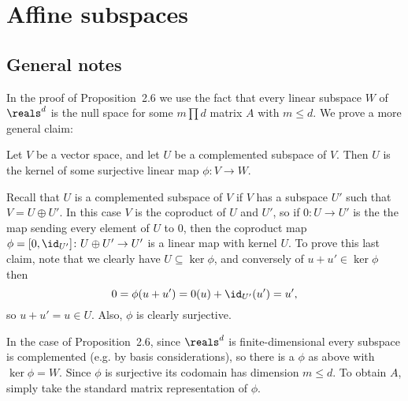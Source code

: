 \documentclass[article, a4paper, 11pt, oneside]{memoir}
\title{\doctitle}
\author{\docauthor}
\numberwithin{equation}{chapter}
\newenvironment{displaytheorem}{%
	\begin{displayquote}\itshape%
}{%
	\end{displayquote}%
}
\theoremstyle{nonumberplain}
\begin{document}
\maketitle

\addtocounter{chapter}{1}

\chapter{Affine subspaces}

\section*{General notes}

\begin{remarkbreak}
    \label{rem:linear-subspaces-are-null-spaces}
    In the proof of Proposition~2.6 we use the fact that every linear subspace $W$ of $\reals^d$ is the null space for some $m \prod d$ matrix $A$ with $m \leq d$. We prove a more general claim:
    \begin{displaytheorem}
        Let $V$ be a vector space, and let $U$ be a complemented subspace of $V$. Then $U$ is the kernel of some surjective linear map $\phi \colon V \to W$.
    \end{displaytheorem}
    Recall that $U$ is a complemented subspace of $V$ if $V$ has a subspace $U'$ such that $V = U \oplus U'$. In this case $V$ is the coproduct of $U$ and $U'$, so if $0 \colon U \to U'$ is the the map sending every element of $U$ to $0$, then the coproduct map $\phi = [0, \id_{U'}] \colon U \oplus U' \to U'$ is a linear map with kernel $U$. To prove this last claim, note that we clearly have $U \subseteq \ker\phi$, and conversely of $u + u' \in \ker\phi$ then
    \begin{equation*}
        0
            = \phi(u+u')
            = 0(u) + \id_{U'}(u')
            = u',
    \end{equation*}
    so $u + u' = u \in U$. Also, $\phi$ is clearly surjective.

    In the case of Proposition~2.6, since $\reals^d$ is finite-dimensional every subspace is complemented (e.g. by basis considerations), so there is a $\phi$ as above with $\ker\phi = W$. Since $\phi$ is surjective its codomain has dimension $m \leq d$. To obtain $A$, simply take the standard matrix representation of $\phi$.
\end{remarkbreak}

\newcommand{\nullspace}[1]{N(#1)}
\end{document}
